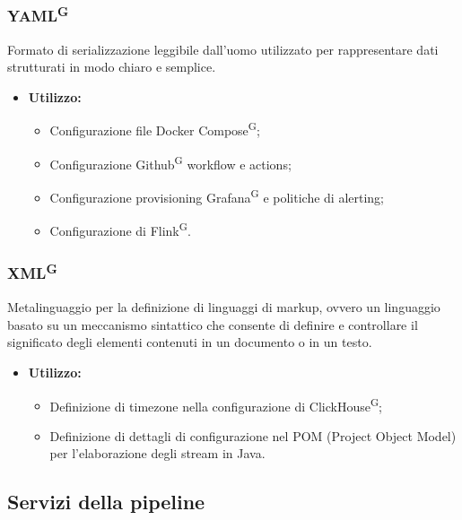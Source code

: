 \documentclass[8pt]{article}
\newcommand{\glossterm}[1]{#1\textsuperscript{G}} %
\begin{document}
\subsubsection{\glossterm{YAML}}
Formato di serializzazione leggibile dall’uomo utilizzato per rappresentare dati strutturati in modo chiaro e semplice.
\begin{itemize}
	\setlength\itemsep{0em}
    \item \textbf{Utilizzo:}
    \begin{itemize}
	\setlength\itemsep{0em}
        \item Configurazione file \glossterm{Docker Compose};
        \item Configurazione \glossterm{Github} workflow e actions; 
        \item Configurazione provisioning \glossterm{Grafana} e politiche di alerting;
        \item Configurazione di \glossterm{Flink}.
    \end{itemize}
\end{itemize}
    \subsubsection{\glossterm{XML}}
 Metalinguaggio per la definizione di linguaggi di markup, ovvero un linguaggio basato su un meccanismo sintattico che consente di definire e controllare il significato degli elementi contenuti in un documento o in un testo.
\begin{itemize}
	\setlength\itemsep{0em}
    \item \textbf{Utilizzo:}
    \begin{itemize}
	\setlength\itemsep{0em}
        \item Definizione di timezone nella configurazione di \glossterm{ClickHouse};
        \item Definizione di dettagli di configurazione nel POM (Project Object Model) per l'elaborazione degli stream in Java.
    \end{itemize}
\end{itemize}
\subsection{Servizi della pipeline}
\end{document}
